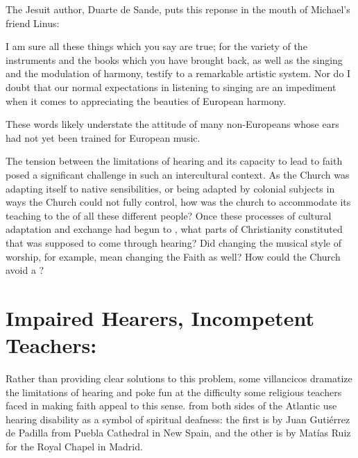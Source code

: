 The Jesuit author, Duarte de Sande, puts this reponse in the mouth of Michael's
friend Linus:
\begin{quoting}
    I am sure all these things which you say are true; for the variety of the
    instruments and the books which you have brought back, as well as the
    singing and the modulation of harmony, testify to a remarkable artistic
    system.
    Nor do I doubt that our normal expectations in listening to singing are an
    impediment when it comes to appreciating the beauties of European harmony.%
        \Autocite[156]{Massarella:JapaneseTravellers}
\end{quoting}
These words likely understate the attitude of many non-Europeans whose ears had
not yet been trained for European music.


The tension between the limitations of hearing and its capacity to lead to
faith posed a significant challenge in such an intercultural context.
As the Church was adapting itself to native sensibilities, or being adapted by
colonial subjects in ways the Church could not fully control, how was the church
to accommodate its teaching to the  of all these
different people?
Once these processes of cultural adaptation and exchange had begun to
, what parts of Christianity constituted  that
was supposed to come through hearing?
Did changing the musical style of worship, for example, mean changing the Faith
as well?
How could the Church avoid a ?

\section[Impaired Hearers, Incompetent Teachers]
{Impaired Hearers, Incompetent Teachers: }

Rather than providing clear solutions to this problem, some villancicos
dramatize the limitations of hearing and poke fun at the difficulty some
religious teachers faced in making faith appeal to this sense.
 from both sides of the Atlantic use hearing
disability as a symbol of spiritual deafness: the first is by Juan Gutiérrez de
Padilla from Puebla Cathedral in New Spain, and the other is by Matías Ruiz for
the Royal Chapel in Madrid.

